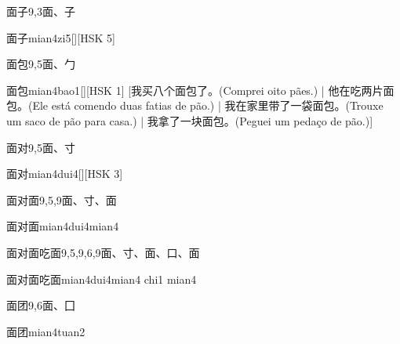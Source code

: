 \begin{entry}{面子}{9,3}{⾯、⼦}
  \begin{phonetics}{面子}{mian4zi5}[][HSK 5]
  \end{phonetics}
\end{entry}

\begin{entry}{面包}{9,5}{⾯、⼓}
  \begin{phonetics}{面包}{mian4bao1}[][HSK 1]
    [我买八个面包了。(Comprei oito pães.) | 他在吃两片面包。(Ele está comendo duas fatias de pão.) | 我在家里带了一袋面包。(Trouxe um saco de pão para casa.) | 我拿了一块面包。(Peguei um pedaço de pão.)]
  \end{phonetics}
\end{entry}

\begin{entry}{面对}{9,5}{⾯、⼨}
  \begin{phonetics}{面对}{mian4dui4}[][HSK 3]
  \end{phonetics}
\end{entry}

\begin{entry}{面对面}{9,5,9}{⾯、⼨、⾯}
  \begin{phonetics}{面对面}{mian4dui4mian4}
  \end{phonetics}
\end{entry}

\begin{entry}{面对面吃面}{9,5,9,6,9}{⾯、⼨、⾯、⼝、⾯}
  \begin{phonetics}{面对面吃面}{mian4dui4mian4 chi1 mian4}
  \end{phonetics}
\end{entry}

\begin{entry}{面团}{9,6}{⾯、⼞}
  \begin{phonetics}{面团}{mian4tuan2}
  \end{phonetics}
\end{entry}

